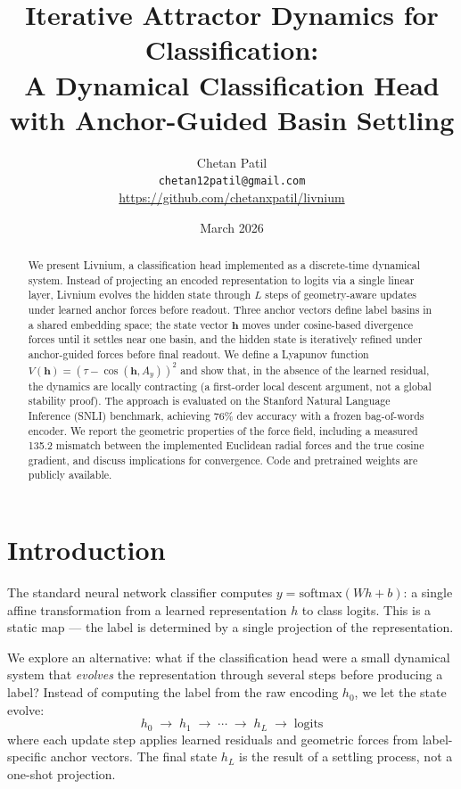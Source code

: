 \documentclass[11pt]{article}
\title{Iterative Attractor Dynamics for Classification:\\A Dynamical Classification Head with Anchor-Guided Basin Settling}
\author{
    Chetan Patil \\
    \texttt{chetan12patil@gmail.com} \\
    \url{https://github.com/chetanxpatil/livnium}
}
\date{March 2026}
\newcommand{\vech}{\bm{h}}
\newcommand{\anchor}[1]{A_{#1}}
\newcommand{\barrier}{\tau}
\begin{document}
\maketitle

\begin{abstract}
We present Livnium, a classification head implemented as a discrete-time
dynamical system. Instead of projecting an encoded representation to logits
via a single linear layer, Livnium evolves the hidden state through
$L$ steps of geometry-aware updates under learned anchor forces before
readout. Three anchor vectors define label basins in a shared embedding
space; the state vector $\vech$ moves under cosine-based divergence forces
until it settles near one basin, and the hidden state is iteratively
refined under anchor-guided forces before final readout. We define a
Lyapunov function $V(\vech) = (\barrier - \cos(\vech, \anchor{y}))^2$
and show that, in the absence of the learned residual, the dynamics are
locally contracting (a first-order local descent argument, not a global
stability proof). The approach is evaluated on the Stanford Natural
Language Inference (SNLI) benchmark, achieving 76\% dev accuracy with a
frozen bag-of-words encoder. We report the geometric properties of the
force field, including a measured 135.2\textdegree{} mismatch between
the implemented Euclidean radial forces and the true cosine gradient,
and discuss implications for convergence. Code and pretrained weights
are publicly available.
\end{abstract}

\section{Introduction}
\label{sec:intro}

The standard neural network classifier computes $y = \text{softmax}(Wh + b)$:
a single affine transformation from a learned representation $h$ to class
logits. This is a static map --- the label is determined by a single
projection of the representation.

We explore an alternative: what if the classification head were a small
dynamical system that \emph{evolves} the representation through several
steps before producing a label? Instead of computing the label from the
raw encoding $h_0$, we let the state evolve:
\[
    h_0 \;\to\; h_1 \;\to\; \cdots \;\to\; h_L \;\to\; \text{logits}
\]
where each update step applies learned residuals and geometric forces
from label-specific anchor vectors. The final state $h_L$ is the result
of a settling process, not a one-shot projection.
\end{document}
